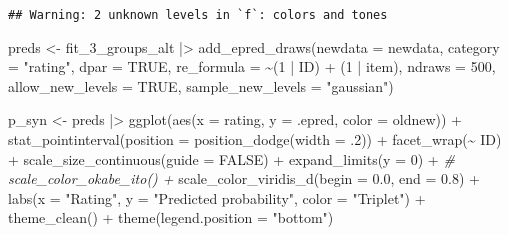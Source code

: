 \documentclass[
  man,floatsintext]{apa7}
\newenvironment{Shaded}{\begin{snugshade}}{\end{snugshade}}
\newcommand{\AttributeTok}[1]{\textcolor[rgb]{0.77,0.63,0.00}{#1}}
\newcommand{\CommentTok}[1]{\textcolor[rgb]{0.56,0.35,0.01}{\textit{#1}}}
\newcommand{\ConstantTok}[1]{\textcolor[rgb]{0.00,0.00,0.00}{#1}}
\newcommand{\DecValTok}[1]{\textcolor[rgb]{0.00,0.00,0.81}{#1}}
\newcommand{\FloatTok}[1]{\textcolor[rgb]{0.00,0.00,0.81}{#1}}
\newcommand{\FunctionTok}[1]{\textcolor[rgb]{0.00,0.00,0.00}{#1}}
\newcommand{\NormalTok}[1]{#1}
\newcommand{\OtherTok}[1]{\textcolor[rgb]{0.56,0.35,0.01}{#1}}
\newcommand{\SpecialCharTok}[1]{\textcolor[rgb]{0.00,0.00,0.00}{#1}}
\newcommand{\StringTok}[1]{\textcolor[rgb]{0.31,0.60,0.02}{#1}}
\begin{document}
\begin{verbatim}
## Warning: 2 unknown levels in `f`: colors and tones
\end{verbatim}

\begin{Shaded}
\begin{Highlighting}[]
\NormalTok{preds }\OtherTok{\textless{}{-}}\NormalTok{ fit\_3\_groups\_alt }\SpecialCharTok{|\textgreater{}} 
  \FunctionTok{add\_epred\_draws}\NormalTok{(}\AttributeTok{newdata =}\NormalTok{ newdata,}
                  \AttributeTok{category =} \StringTok{"rating"}\NormalTok{,}
                  \AttributeTok{dpar =} \ConstantTok{TRUE}\NormalTok{,}
                  \AttributeTok{re\_formula =} \SpecialCharTok{\textasciitilde{}}\NormalTok{(}\DecValTok{1} \SpecialCharTok{|}\NormalTok{ ID) }\SpecialCharTok{+}\NormalTok{ (}\DecValTok{1} \SpecialCharTok{|}\NormalTok{ item),}
                  \AttributeTok{ndraws =} \DecValTok{500}\NormalTok{,}
                  \AttributeTok{allow\_new\_levels =} \ConstantTok{TRUE}\NormalTok{,}
                  \AttributeTok{sample\_new\_levels =} \StringTok{"gaussian"}\NormalTok{)}
\end{Highlighting}
\end{Shaded}

\begin{Shaded}
\begin{Highlighting}[]
\NormalTok{p\_syn }\OtherTok{\textless{}{-}}\NormalTok{ preds }\SpecialCharTok{|\textgreater{}} 
  \FunctionTok{ggplot}\NormalTok{(}\FunctionTok{aes}\NormalTok{(}\AttributeTok{x =}\NormalTok{ rating, }\AttributeTok{y =}\NormalTok{ .epred, }\AttributeTok{color =}\NormalTok{ oldnew)) }\SpecialCharTok{+}
  \FunctionTok{stat\_pointinterval}\NormalTok{(}\AttributeTok{position =} \FunctionTok{position\_dodge}\NormalTok{(}\AttributeTok{width =}\NormalTok{ .}\DecValTok{2}\NormalTok{)) }\SpecialCharTok{+}
  \FunctionTok{facet\_wrap}\NormalTok{(}\SpecialCharTok{\textasciitilde{}}\NormalTok{ ID) }\SpecialCharTok{+}
  \FunctionTok{scale\_size\_continuous}\NormalTok{(}\AttributeTok{guide =} \ConstantTok{FALSE}\NormalTok{) }\SpecialCharTok{+}
  \FunctionTok{expand\_limits}\NormalTok{(}\AttributeTok{y =} \DecValTok{0}\NormalTok{) }\SpecialCharTok{+}
  \CommentTok{\# scale\_color\_okabe\_ito() +}
  \FunctionTok{scale\_color\_viridis\_d}\NormalTok{(}\AttributeTok{begin =} \FloatTok{0.0}\NormalTok{, }\AttributeTok{end =} \FloatTok{0.8}\NormalTok{) }\SpecialCharTok{+}
  \FunctionTok{labs}\NormalTok{(}\AttributeTok{x =} \StringTok{"Rating"}\NormalTok{, }\AttributeTok{y =} \StringTok{"Predicted probability"}\NormalTok{, }\AttributeTok{color =} \StringTok{"Triplet"}\NormalTok{) }\SpecialCharTok{+}
  \FunctionTok{theme\_clean}\NormalTok{() }\SpecialCharTok{+}
  \FunctionTok{theme}\NormalTok{(}\AttributeTok{legend.position =} \StringTok{"bottom"}\NormalTok{)}
\end{Highlighting}
\end{Shaded}
\end{document}
